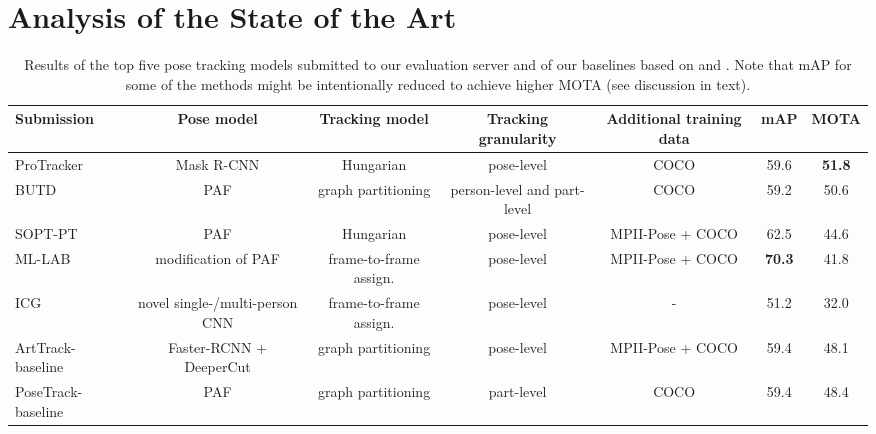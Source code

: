\documentclass[10pt,twocolumn,letterpaper]{article}
\newcommand{\ProTracker}{ProTracker~\cite{ProTracker} \xspace}
\newcommand{\BUTD}{BUTD~\cite{BUDT}\xspace}
\newcommand{\SOPTPT}{SOPT-PT~\cite{SOPT-PT}\xspace}
\newcommand{\MLLab}{ML-LAB~\cite{ML-LAB}\xspace}
\newcommand{\ICG}{ICG~\cite{ICG}\xspace}
\begin{document}
 \section{Analysis of the State of the Art}
\label{sec:analysis-sota}
\tabcolsep 6pt
\begin{table*}[tbp]
\centering
  \resizebox{\linewidth}{!} {\begin{tabular}{l c c c c c c}
    \toprule
    Submission & Pose model & Tracking model &  Tracking granularity &
                                                                       Additional training data & mAP & MOTA  \\
\midrule
\ProTracker & Mask R-CNN \cite{he17iccv}  & Hungarian & pose-level & COCO  & 59.6  & \textbf{51.8} \\ \BUTD  & PAF \cite{cao16arxiv}  & graph partitioning & person-level and part-level & COCO  & 59.2 & 50.6 \\ \SOPTPT & PAF \cite{cao16arxiv}  & Hungarian & pose-level & MPII-Pose + COCO  & 62.5 & 44.6\\ \MLLab & modification of PAF \cite{cao16arxiv}  &  frame-to-frame  assign. & pose-level & MPII-Pose + COCO & \textbf{70.3} & 41.8 \\\ICG & novel single-/multi-person CNN & frame-to-frame assign. & pose-level  & - & 51.2 & 32.0 \\\midrule
ArtTrack-baseline & Faster-RCNN
                                      \cite{huang2016speed} +
                                      DeeperCut
                                      \cite{insafutdinov16eccv}  &
                                                                    graph
                                                                    partitioning
                                             & pose-level & MPII-Pose + COCO &  59.4 & 48.1  \\
PoseTrack-baseline & PAF \cite{cao16arxiv} & graph partitioning & part-level & COCO & 59.4 & 48.4 \\
\bottomrule
  \end{tabular}
}
 \caption[]{Results of the top five pose tracking models submitted to our evaluation
  server and of our baselines based on \cite{insafutdinov17cvpr} and \cite {Iqbal:2017:CVPR}. Note that mAP for some of the methods might be
  intentionally reduced to achieve higher MOTA (see discussion in text).}
\label{tab:posetrack_mota}
\end{table*}
 \tabcolsep 6pt
\end{document}
